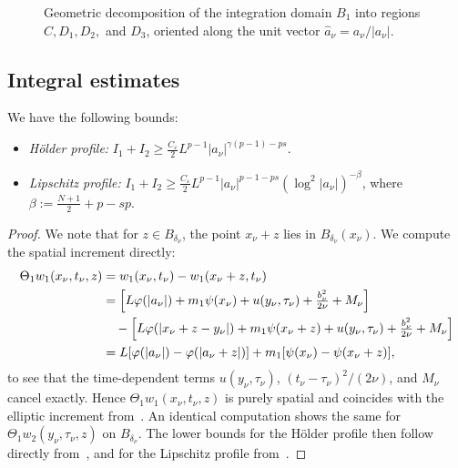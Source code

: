 \documentclass[11pt, a4paper, twoside]{article}
\theoremstyle{definition}
\theoremstyle{remark}
\begin{document}
\begin{figure}[htpb]
    \caption{Geometric decomposition of the integration domain $B_1$ into regions $C, D_1, D_2,$ and $D_3$, oriented along the unit vector $\hat{a}_\nu = a_\nu / |a_\nu|$.}
    \label{fig:domain_decomposition}
\end{figure}

\subsection{Integral estimates}
\label{sec:integral-estimates}

\begin{lemma}
\label{lem:parabolic-I1-I2}
We have the following bounds:
\begin{itemize}
  \item \emph{H\"{o}lder profile:} $I_1 + I_2 \ge \tfrac{C_\varepsilon}{2} L^{p-1}|a_\nu|^{\gamma(p-1)-ps}$.
  \item \emph{Lipschitz profile:} $I_1 + I_2 \ge \tfrac{C_\varepsilon}{2} L^{p-1}|a_\nu|^{p-1-ps} (\log^2|a_\nu|)^{-\beta}$, where $\beta := \tfrac{N+1}{2}+p-sp$.
\end{itemize}
\end{lemma}
\begin{proof}
We note that for $z \in B_{\delta_\nu}$, the point $x_\nu + z$ lies in $B_{\delta_\nu}(x_\nu)$. We compute the spatial increment directly:
\begin{align*}
  \Theta_1 w_1(x_\nu,t_\nu,z)
  &= w_1(x_\nu,t_\nu) - w_1(x_\nu+z,t_\nu) \\
  &= \Bigl[L\varphi(|a_\nu|) + m_1\psi(x_\nu) + u(y_\nu,\tau_\nu) + \tfrac{b_\nu^2}{2\nu} + M_\nu\Bigr] \\
  &\quad - \Bigl[L\varphi(|x_\nu+z-y_\nu|) + m_1\psi(x_\nu+z) + u(y_\nu,\tau_\nu) + \tfrac{b_\nu^2}{2\nu} + M_\nu\Bigr] \\
  &= L[\varphi(|a_\nu|) - \varphi(|a_\nu+z|)] + m_1[\psi(x_\nu) - \psi(x_\nu+z)],
\end{align*}
to see that the time-dependent terms $u(y_\nu,\tau_\nu)$, $(t_\nu-\tau_\nu)^2/(2\nu)$, and $M_\nu$ cancel exactly. Hence $\Theta_1 w_1(x_\nu,t_\nu,z)$ is purely spatial and coincides with the elliptic increment from~\cite{BiswasTopp2025}. An identical computation shows the same for $\Theta_1 w_2(y_\nu,\tau_\nu,z)$ on $B_{\delta_\nu}$. The lower bounds for the H\"{o}lder profile then follow directly from~\cite[Lemmas~3.1, 3.2, 4.1, 4.2]{BiswasTopp2025}, and for the Lipschitz profile from~\cite[Proof of Theorem~2.1]{BiswasTopp2025}.
\end{proof}
\end{document}
